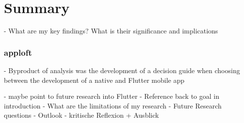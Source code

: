 \chapter{Summary}
- What are my key findings? What is their significance and implications

\subsection{apploft}
- Byproduct of analysis was the development of a decision guide when choosing
between the development of a native and Flutter mobile app

- maybe point to future research into Flutter
- Reference back to goal in introduction
- What are the limitations of my research
- Future Research questions
- Outlook
- kritische Reflexion + Ausblick
